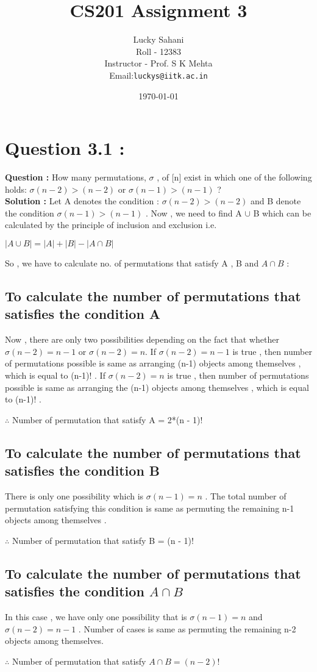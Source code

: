 \documentclass[]{article}
\title{CS201 Assignment 3 }
\author{Lucky Sahani\\
      Roll - 12383\\
       Instructor - Prof. S K Mehta \\
	       Email:\texttt{luckys@iitk.ac.in}}
\date{\today}
\begin{document}
\maketitle

\section { Question 3.1 : }
\label{sec:q1}
{\bf Question :} How many permutations, $\sigma$ , of [n] exist in which one of the following holds: $\sigma(n - 2) > (n - 2)$ or $\sigma(n - 1) > (n - 1) $ ?\\
{\bf Solution : } Let A denotes the condition : $\sigma(n - 2) > (n - 2)$ and B denote the condition  $\sigma(n - 1) > (n - 1) $ . Now , we need to find A $\cup$ B which can be calculated by the principle of inclusion and exclusion i.e.
\begin {center}
$|A \cup B| = |A| + |B| - |A \cap B| $
\end{center}
So , we have to calculate no. of permutations that satisfy A , B and $A\cap B$ :
\subsection{To calculate the number of permutations that satisfies the condition A }
Now , there are only two possibilities depending on the fact that whether $\sigma(n-2)=n-1$ or $\sigma(n-2)=n$. If $\sigma(n-2)=n-1$ is true , then number of permutations possible is same as arranging (n-1) objects among themselves , which is equal to (n-1)! . If $\sigma(n-2)=n$ is true , then number of permutations possible is same as arranging the (n-1) objects among themselves , which is equal to (n-1)! . 
\begin{center}
$\therefore$ Number of permutation that satisfy A = 2*(n - 1)!
\end{center}

\subsection{ To calculate the number of permutations that satisfies the condition B }
There is only one possibility which is $\sigma(n-1)=n$ . The total number of permutation satisfying this condition is same as permuting the remaining n-1 objects among themselves .
\begin{center}
$\therefore$ Number of permutation that satisfy B = (n - 1)!
\end{center}

\subsection{ To calculate the number of permutations that satisfies the condition  $A \cap B $ }
In this case , we have only one possibility that is $\sigma(n-1)=n$ and $\sigma(n-2)=n-1$ . Number of cases is same as permuting the remaining n-2 objects among themselves.
\begin{center}
$\therefore$ Number of permutation that satisfy $A \cap B = (n - 2)!$
\end{center}
\end{document}
